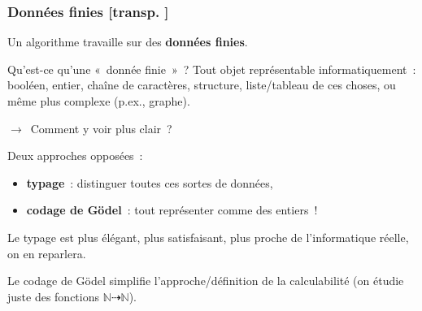 \documentclass[mathserif,a4paper,aspectratio=169]{beamer}
\renewcommand{\frametitle}[1]{\subsubsection*{#1 {\footnotesize[transp. \insertframenumber]}}}
\begin{document}
\begin{frame}
\frametitle{Données finies}

Un algorithme travaille sur des \textbf{données finies}.

\medskip

Qu'est-ce qu'une « donnée finie » ?  Tout objet représentable
informatiquement : booléen, entier, chaîne de caractères, structure,
liste/tableau de ces choses, ou même plus complexe (p.ex., graphe).

\medskip

$\rightarrow$ Comment y voir plus clair ?

\bigskip

Deux approches opposées :
\begin{itemize}
\item\textbf{typage} : distinguer toutes ces sortes de données,
\item\textbf{codage de Gödel} : tout représenter comme des entiers !
\end{itemize}

\bigskip

Le typage est plus élégant, plus satisfaisant, plus proche de
l'informatique réelle, on en reparlera.

\smallskip

Le codage de Gödel simplifie l'approche/définition de la calculabilité
(on étudie juste des fonctions $\mathbb{N} \dasharrow \mathbb{N}$).

\end{frame}
%
\end{document}
